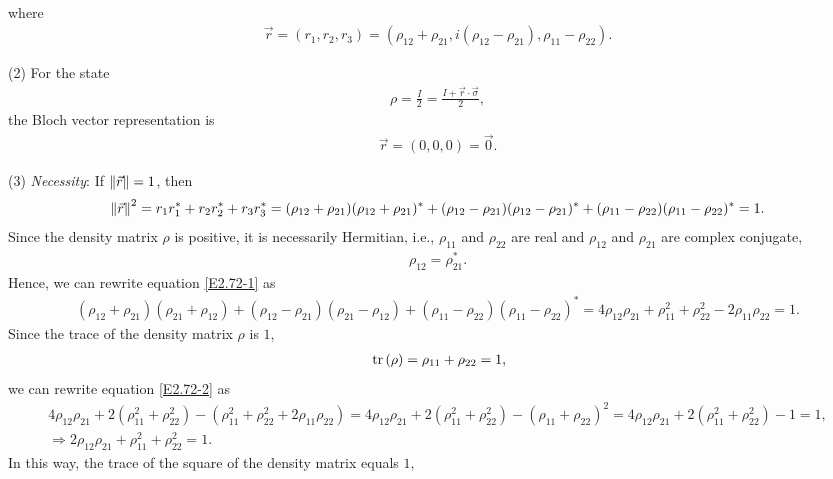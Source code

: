 \documentclass[en]{sol-man}
\begin{document}
\begin{sol}
\begin{align}
    \end{align}
    where
    \begin{align}
        \vec{r}=(r_1,r_2,r_3)=(\rho_{12}+\rho_{21},i(\rho_{12}-\rho_{21}),\rho_{11}-\rho_{22}).
    \end{align}
    \item[(2)] For the state
    \begin{align}
        \rho=\frac{I}{2}=\frac{I+\vec{r}\cdot\vec{\sigma}}{2},
    \end{align}
    the Bloch vector representation is
    \begin{align}
        \vec{r}=(0,0,0)=\vec{0}.
    \end{align}
    \item[(3)] \emph{Necessity}: If $\left\lVert\vec{r}\right\rVert=1$, then
    \begin{align}
        \label{E2.72-1}
        \left\lVert\vec{r}\right\rVert^2=r_1r_1^*+r_2r_2^*+r_3r_3^*=(\rho_{12}+\rho_{21})(\rho_{12}+\rho_{21})^*+(\rho_{12}-\rho_{21})(\rho_{12}-\rho_{21})^*+(\rho_{11}-\rho_{22})(\rho_{11}-\rho_{22})^*=1.
    \end{align}
    Since the density matrix $\rho$ is positive, it is necessarily Hermitian, i.e., $\rho_{11}$ and $\rho_{22}$ are real and $\rho_{12}$ and $\rho_{21}$ are complex conjugate,
    \begin{align}
        \rho_{12}=\rho_{21}^*.
    \end{align}
    Hence, we can rewrite equation \eqref{E2.72-1} as
    \begin{align}
        \label{E2.72-2}
        (\rho_{12}+\rho_{21})(\rho_{21}+\rho_{12})+(\rho_{12}-\rho_{21})(\rho_{21}-\rho_{12})+(\rho_{11}-\rho_{22})(\rho_{11}-\rho_{22})^*=4\rho_{12}\rho_{21}+\rho_{11}^2+\rho_{22}^2-2\rho_{11}\rho_{22}=1.
    \end{align}
    Since the trace of the density matrix $\rho$ is $1$,
    \begin{align}
        \,\mathrm{tr}\,(\rho)=\rho_{11}+\rho_{22}=1,
    \end{align}
    we can rewrite equation \eqref{E2.72-2} as
    \begin{gather}
        4\rho_{12}\rho_{21}+2(\rho_{11}^2+\rho_{22}^2)-(\rho_{11}^2+\rho_{22}^2+2\rho_{11}\rho_{22})=4\rho_{12}\rho_{21}+2(\rho_{11}^2+\rho_{22}^2)-(\rho_{11}+\rho_{22})^2=4\rho_{12}\rho_{21}+2(\rho_{11}^2+\rho_{22}^2)-1=1,\\
        \Longrightarrow 2\rho_{12}\rho_{21}+\rho_{11}^2+\rho_{22}^2=1.
    \end{gather}
    In this way, the trace of the square of the density matrix equals $1$,

\end{sol}
\end{document}

